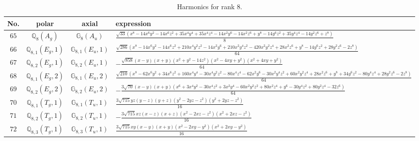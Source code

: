 \documentclass[fleqn,8pt,landscape]{jsarticle}
\begin{document}
\begin{table}[ht!]
\begin{center}
\caption{Harmonics for rank 8.}
\renewcommand{\arraystretch}{1.3}
\begin{tabular}{cccl} \hline \hline
No. & polar & axial & expression \\ \hline
$ 65 $ & $ \mathbb{Q}_{8}(A_{g}) $ & $ \mathbb{G}_{8}(A_{u}) $ & $ \frac{\sqrt{33} \left(x^{8} - 14 x^{6} y^{2} - 14 x^{6} z^{2} + 35 x^{4} y^{4} + 35 x^{4} z^{4} - 14 x^{2} y^{6} - 14 x^{2} z^{6} + y^{8} - 14 y^{6} z^{2} + 35 y^{4} z^{4} - 14 y^{2} z^{6} + z^{8}\right)}{8} $ \\
$ 66 $ & $ \mathbb{Q}_{8,1}(E_{g},1) $ & $ \mathbb{G}_{8,1}(E_{u},1) $ & $ \frac{\sqrt{286} \left(x^{8} - 14 x^{6} y^{2} - 14 x^{6} z^{2} + 210 x^{4} y^{2} z^{2} - 14 x^{2} y^{6} + 210 x^{2} y^{4} z^{2} - 420 x^{2} y^{2} z^{4} + 28 x^{2} z^{6} + y^{8} - 14 y^{6} z^{2} + 28 y^{2} z^{6} - 2 z^{8}\right)}{64} $ \\
$ 67 $ & $ \mathbb{Q}_{8,2}(E_{g},1) $ & $ \mathbb{G}_{8,2}(E_{u},1) $ & $ - \frac{\sqrt{858} \left(x - y\right) \left(x + y\right) \left(x^{2} + y^{2} - 14 z^{2}\right) \left(x^{2} - 4 x y + y^{2}\right) \left(x^{2} + 4 x y + y^{2}\right)}{64} $ \\
$ 68 $ & $ \mathbb{Q}_{8,1}(E_{g},2) $ & $ \mathbb{G}_{8,1}(E_{u},2) $ & $ \frac{\sqrt{210} \left(x^{8} - 62 x^{6} y^{2} + 34 x^{6} z^{2} + 160 x^{4} y^{4} - 30 x^{4} y^{2} z^{2} - 80 x^{4} z^{4} - 62 x^{2} y^{6} - 30 x^{2} y^{4} z^{2} + 60 x^{2} y^{2} z^{4} + 28 x^{2} z^{6} + y^{8} + 34 y^{6} z^{2} - 80 y^{4} z^{4} + 28 y^{2} z^{6} - 2 z^{8}\right)}{64} $ \\
$ 69 $ & $ \mathbb{Q}_{8,2}(E_{g},2) $ & $ \mathbb{G}_{8,2}(E_{u},2) $ & $ - \frac{3 \sqrt{70} \left(x - y\right) \left(x + y\right) \left(x^{6} + 3 x^{4} y^{2} - 30 x^{4} z^{2} + 3 x^{2} y^{4} - 60 x^{2} y^{2} z^{2} + 80 x^{2} z^{4} + y^{6} - 30 y^{4} z^{2} + 80 y^{2} z^{4} - 32 z^{6}\right)}{64} $ \\
$ 70 $ & $ \mathbb{Q}_{8,1}(T_{g},1) $ & $ \mathbb{G}_{8,1}(T_{u},1) $ & $ \frac{3 \sqrt{715} y z \left(y - z\right) \left(y + z\right) \left(y^{2} - 2 y z - z^{2}\right) \left(y^{2} + 2 y z - z^{2}\right)}{16} $ \\
$ 71 $ & $ \mathbb{Q}_{8,2}(T_{g},1) $ & $ \mathbb{G}_{8,2}(T_{u},1) $ & $ - \frac{3 \sqrt{715} x z \left(x - z\right) \left(x + z\right) \left(x^{2} - 2 x z - z^{2}\right) \left(x^{2} + 2 x z - z^{2}\right)}{16} $ \\
$ 72 $ & $ \mathbb{Q}_{8,3}(T_{g},1) $ & $ \mathbb{G}_{8,3}(T_{u},1) $ & $ \frac{3 \sqrt{715} x y \left(x - y\right) \left(x + y\right) \left(x^{2} - 2 x y - y^{2}\right) \left(x^{2} + 2 x y - y^{2}\right)}{16} $ \\

\end{tabular}
\end{center}
\end{table}
\end{document}
